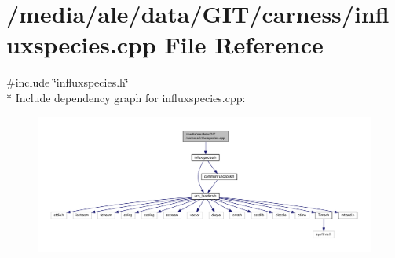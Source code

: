 \hypertarget{a00075}{\section{/media/ale/data/\-G\-I\-T/carness/influxspecies.cpp File Reference}
\label{a00075}
}
{\ttfamily \#include \char`\"{}influxspecies.\-h\char`\"{}}\\*
Include dependency graph for influxspecies.\-cpp\-:\nopagebreak
\begin{figure}[H]
\begin{center}
\leavevmode
\includegraphics[width=350pt]{a00145}
\end{center}
\end{figure}
